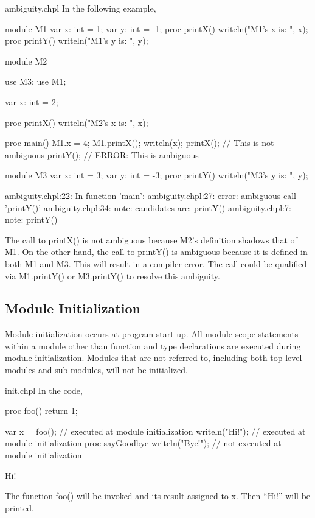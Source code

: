 \begin{chapelexample}{ambiguity.chpl}
In the following example,
\begin{chapel}
module M1 {
  var x: int = 1;
  var y: int = -1;
  proc printX() {
    writeln("M1's x is: ", x);
  }
  proc printY() {
    writeln("M1's y is: ", y);
  }
}
 
module M2 {
  use M3;
  use M1;

  var x: int = 2;

  proc printX() {
    writeln("M2's x is: ", x);
  }

  proc main() {
    M1.x = 4;
    M1.printX();
    writeln(x);
    printX(); // This is not ambiguous
    printY(); // ERROR: This is ambiguous
  }
}

module M3 {
  var x: int = 3;
  var y: int = -3;
  proc printY() {
    writeln("M3's y is: ", y);
  }
}
\end{chapel}
\begin{chapeloutput}
ambiguity.chpl:22: In function 'main':
ambiguity.chpl:27: error: ambiguous call 'printY()'
ambiguity.chpl:34: note: candidates are: printY()
ambiguity.chpl:7: note:                 printY()
\end{chapeloutput}
The call to printX() is not ambiguous because M2's definition shadows
that of M1.  On the other hand, the call to printY() is ambiguous
because it is defined in both M1 and M3.  This will result in a
compiler error.  The call could be qualified via M1.printY() or M3.printY()
to resolve this ambiguity.
\end{chapelexample}

\subsection{Module Initialization}
\label{Module_Initialization}

Module initialization occurs at program start-up.  All module-scope
statements within a module other than function and type declarations are
executed during module initialization. Modules that are not referred to,
including both top-level modules and sub-modules, will not be initialized.

\begin{chapelexample}{init.chpl}
In the code,
\begin{chapelpre}
proc foo() {
    return 1;
}
\end{chapelpre}
\begin{chapel}
var x = foo();       // executed at module initialization
writeln("Hi!");      // executed at module initialization
proc sayGoodbye {
  writeln("Bye!");   // not executed at module initialization
}
\end{chapel}
\begin{chapeloutput}
Hi!
\end{chapeloutput}
The function foo() will be invoked and its result assigned to x.  Then
``Hi!'' will be printed.
\end{chapelexample}

